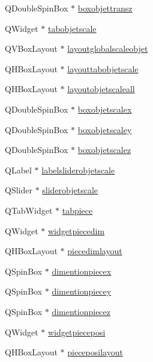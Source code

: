 \begin{DoxyCompactItemize}
\item 
Q\+Double\+Spin\+Box $\ast$ \hyperlink{class_mondock_ab0102fb06cf68a8c70fed13550b4dcb6}{boxobjettransz}
\item 
Q\+Widget $\ast$ \hyperlink{class_mondock_a2463c02b8f4ff3f1ff23f2f72e3c0f48}{tabobjetscale}
\item 
Q\+V\+Box\+Layout $\ast$ \hyperlink{class_mondock_a376d034b08d180ee9d91ab0c5826a5d8}{layoutglobalscaleobjet}
\item 
Q\+H\+Box\+Layout $\ast$ \hyperlink{class_mondock_a7337ba165d8f7543e3469a2a25f3f062}{layouttabobjetscale}
\item 
Q\+H\+Box\+Layout $\ast$ \hyperlink{class_mondock_a4adea363f864aeaa15cbf636dca8f4cc}{layoutobjetscaleall}
\item 
Q\+Double\+Spin\+Box $\ast$ \hyperlink{class_mondock_a0300855d7d2e07ff9f29acfe6aabf86a}{boxobjetscalex}
\item 
Q\+Double\+Spin\+Box $\ast$ \hyperlink{class_mondock_a111e6d0603d220eafef5fe6754ee5686}{boxobjetscaley}
\item 
Q\+Double\+Spin\+Box $\ast$ \hyperlink{class_mondock_a23022e2424b108b94b9519167b702b2a}{boxobjetscalez}
\item 
Q\+Label $\ast$ \hyperlink{class_mondock_a1536ab110ce2aff8fc022ccf80ee0cff}{labelsliderobjetscale}
\item 
Q\+Slider $\ast$ \hyperlink{class_mondock_a46bd66f14e79aed16f26a9475640fcbd}{sliderobjetscale}
\item 
Q\+Tab\+Widget $\ast$ \hyperlink{class_mondock_a5985ccaca36a0e545e6e74a84623b1a9}{tabpiece}
\item 
Q\+Widget $\ast$ \hyperlink{class_mondock_abe21ad30be63590c6ce6e18969e9f082}{widgetpiecedim}
\item 
Q\+H\+Box\+Layout $\ast$ \hyperlink{class_mondock_af9d31eb2800c5608dc9da41dcf1ca1d0}{piecedimlayout}
\item 
Q\+Spin\+Box $\ast$ \hyperlink{class_mondock_ab3829ab678beb2bc391bdb325b0beda1}{dimentionpiecex}
\item 
Q\+Spin\+Box $\ast$ \hyperlink{class_mondock_a60c16f4209470967b672f33a2c4fe67c}{dimentionpiecey}
\item 
Q\+Spin\+Box $\ast$ \hyperlink{class_mondock_ab9605a7a3ee01aec5f5b29fc111abdeb}{dimentionpiecez}
\item 
Q\+Widget $\ast$ \hyperlink{class_mondock_a960802e2aa94a22487ff03bbaa102a02}{widgetpieceposi}
\item 
Q\+H\+Box\+Layout $\ast$ \hyperlink{class_mondock_a676e96b53de7e8e4fd8f82c990b074df}{pieceposilayout}

\end{DoxyCompactItemize}
